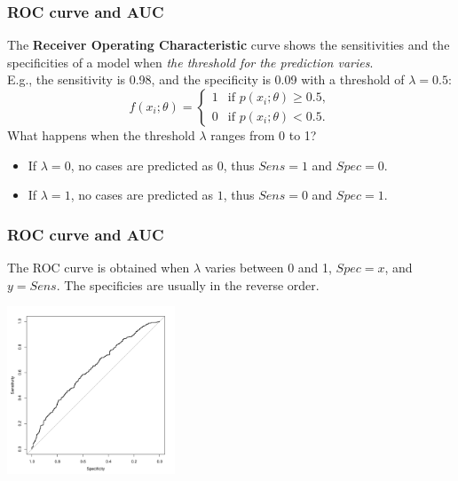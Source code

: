 \begin{frame}
\frametitle{ROC curve and AUC}
The {\bf Receiver Operating Characteristic} curve shows the sensitivities and the specificities of a model when {\it the threshold for the prediction varies}.\\
\vspace{0.3cm}
E.g., the sensitivity is 0.98, and the specificity is 0.09 with a threshold of $\lambda=0.5$: 
$$
f(x_i;\theta)=
\left\{\begin{array}{ll}
1 & \mbox{if } p(x_i;\theta) \geq 0.5,\\
0& \mbox{if } p(x_i;\theta) < 0.5.
\end{array}
\right.
$$ 
What happens when the threshold $\lambda$ ranges from 0 to 1?
\begin{itemize}
\item If $\lambda=0$, no cases are predicted as $0$, thus $Sens=1$ and $Spec=0$.
\item If $\lambda=1$, no cases are predicted as $1$, thus $Sens=0$ and $Spec=1$.
\end{itemize}
\end{frame}
\begin{frame}
\frametitle{ROC curve and AUC}
The ROC curve is obtained when $\lambda$ varies between 0 and 1, $Spec=x$, and $y=Sens$. The specificies are usually in the reverse order.
\begin{center}
\includegraphics[width=5cm]{../Graphs/ROC_curve.png}
\end{center}
\end{frame}
